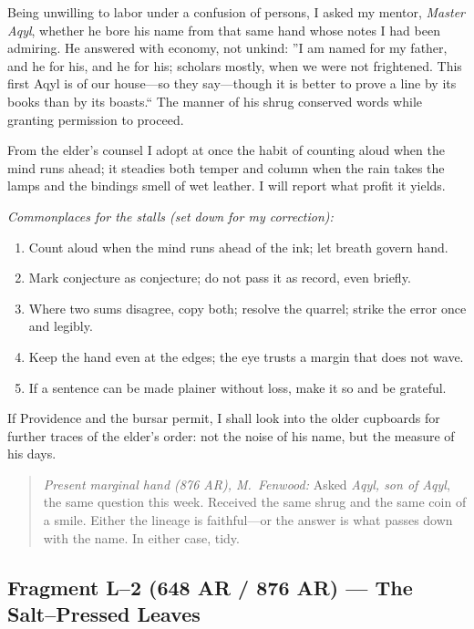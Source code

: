 \documentclass[11pt]{article}
\numberwithin{equation}{section} %
\theoremstyle{plain} %
\theoremstyle{definition} %
\theoremstyle{remark} %
\begin{document}
Being unwilling to labor under a confusion of persons, I asked my mentor, \textit{Master Aqyl}, whether he bore his name from that same hand whose notes I had been admiring. He answered with economy, not unkind: ''I am named for my father, and he for his, and he for his; scholars mostly, when we were not frightened. This first Aqyl is of our house---so they say---though it is better to prove a line by its books than by its boasts.`` The manner of his shrug conserved words while granting permission to proceed.

From the elder's counsel I adopt at once the habit of counting aloud when the mind runs ahead; it steadies both temper and column when the rain takes the lamps and the bindings smell of wet leather. I will report what profit it yields.

\medskip
\noindent\textit{Commonplaces for the stalls (set down for my correction):}
\begin{enumerate}\setlength\itemsep{0.25em}
  \item Count aloud when the mind runs ahead of the ink; let breath govern hand.
  \item Mark conjecture as conjecture; do not pass it as record, even briefly.
  \item Where two sums disagree, copy both; resolve the quarrel; strike the error once and legibly.
  \item Keep the hand even at the edges; the eye trusts a margin that does not wave.
  \item If a sentence can be made plainer without loss, make it so and be grateful.
\end{enumerate}

If Providence and the bursar permit, I shall look into the older cupboards for further traces of the elder's order: not the noise of his name, but the measure of his days.

\medskip
\begin{quote}\small
\textit{Present marginal hand (876 AR), M.\ Fenwood:} Asked \textit{Aqyl, son of Aqyl}, the same question this week. Received the same shrug and the same coin of a smile. Either the lineage is faithful---or the answer is what passes down with the name. In either case, tidy.
\end{quote}

\subsection{Fragment L--2 (648 AR / 876 AR) --- The Salt--Pressed Leaves}
\label{frag:l2}
\end{document}

